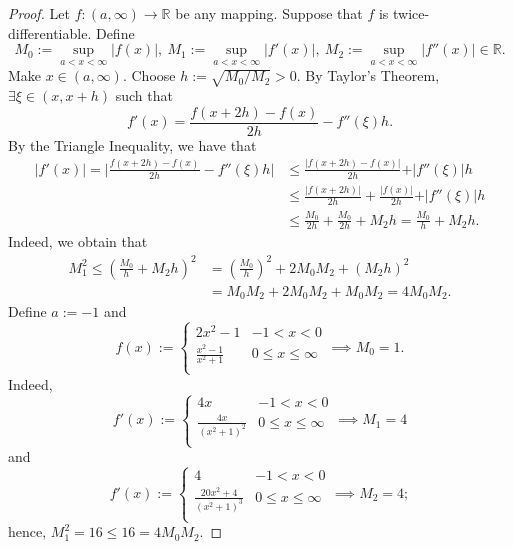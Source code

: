 \documentclass{amsart}
\theoremstyle{definition}
\begin{document}
\begin{proof}
    Let $f: (a,\infty) \to \mathbb{R}$ be any mapping. Suppose that $f$ is twice-differentiable. Define 
    \[
    M_0 := \sup_{a < x < \infty}\vert f(x) \vert, \ M_1 := \sup_{a < x < \infty}\vert f'(x) \vert, \ M_2 := \sup_{a < x < \infty}\vert f''(x) \vert \in \mathbb{R}.
    \]
    Make $x \in (a,\infty)$. Choose $h := \sqrt{M_0/M_2} > 0$. By Taylor's Theorem, $\exists \xi \in (x,x+h)$ such that 
    \[
    f'(x) = \frac{f(x+2h) - f(x)}{2h} - f''(\xi)h.  
    \]
    By the Triangle Inequality, we have that
    \begin{align*}
        \vert f'(x) \vert = \bigg\vert \frac{f(x+2h) - f(x)}{2h} - f''(\xi)h \bigg\vert &\leq \frac{\vert f(x+2h) - f(x) \vert}{2h} + \vert f''(\xi) \vert h \\
        &\leq \frac{\vert f(x+2h) \vert }{2h} + \frac{\vert f(x) \vert}{2h} + \vert f''(\xi) \vert h \\ 
        &\leq \frac{M_0}{2h} + \frac{M_0}{2h} + M_2h = \frac{M_0}{h} + M_2h.
    \end{align*}
    Indeed, we obtain that 
    \begin{align*}
        M_1^2 \leq \left(\frac{M_0}{h} + M_2h\right)^2 &= \left(\frac{M_0}{h}\right)^2 + 2M_0M_2 + (M_2h)^2 \\
        &= M_0M_2 + 2M_0M_2 + M_0M_2 = 4M_0M_2.
    \end{align*}
    Define $a := -1$ and   
    \[
    f(x) := \begin{cases}
        2x^2-1 & -1 < x < 0 \\
        \frac{x^2-1}{x^2+1} & 0 \leq x \leq \infty \\
    \end{cases} \implies M_0 = 1.
    \]
    Indeed, 
    \[
    f'(x) := \begin{cases}
        4x & -1 < x < 0 \\
        \frac{4x}{(x^2+1)^2} & 0 \leq x \leq \infty \\
    \end{cases} \implies M_1 = 4
    \]
    and 
    \[
    f'(x) := \begin{cases}
        4 & -1 < x < 0 \\
        \frac{20x^2+4}{(x^2+1)^3} & 0 \leq x \leq \infty \\
    \end{cases} \implies M_2 = 4;
    \]
    hence, $M_1^2 = 16 \leq 16 = 4M_0M_2$.
\end{proof}
\end{document}
